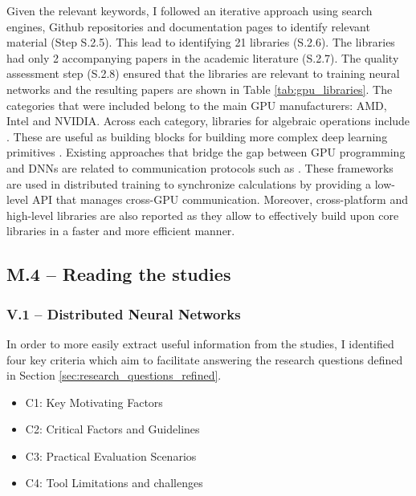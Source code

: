 
Given the relevant keywords, I followed an iterative approach using search engines, Github
repositories and documentation pages to identify relevant material (Step S.2.5). This lead to
identifying 21 libraries (S.2.6). The libraries had only 2 accompanying papers
\cite{chetlur_cudnn_2014,okuta_cupy_2017} in the academic literature (S.2.7). The quality
assessment step (S.2.8) ensured that the libraries are relevant to training neural networks and the
resulting papers are shown in Table \ref{tab:gpu_libraries}. The categories that were included
belong to the main GPU manufacturers: AMD, Intel and NVIDIA. Across each category, libraries for
algebraic operations include \cite{noauthor_cublas_nodate,noauthor_rocmrocblas_2025,
	noauthor_uxlfoundationonemath_2025}. These are useful as building blocks for building more complex
deep learning primitives
\cite{chetlur_cudnn_2014,noauthor_rocmmiopen_2025,onednn_contributors_oneapi_2025}. Existing
approaches that bridge the gap between GPU programming and DNNs are related to communication
protocols such as
\cite{noauthor_nvidianccl_2025,noauthor_rocmrccl_2025,noauthor_uxlfoundationoneccl_2025}. These
frameworks are used in distributed training to synchronize calculations by providing a low-level
API that manages cross-GPU communication. Moreover, cross-platform and high-level libraries are
also reported as they allow to effectively build upon core libraries in a faster and more efficient
manner.

\subsection{M.4 -- Reading the studies}
\label{sec:reading-studies}
\subsubsection{V.1 -- Distributed Neural Networks}

In order to more easily extract useful information from the studies, I identified four key criteria
which aim to facilitate answering the research questions defined in Section
\ref{sec:research_questions_refined}.

\begin{itemize}
	\item C1: Key Motivating Factors
	\item C2: Critical Factors and Guidelines
	\item C3: Practical Evaluation Scenarios
	\item C4: Tool Limitations and challenges
\end{itemize}

